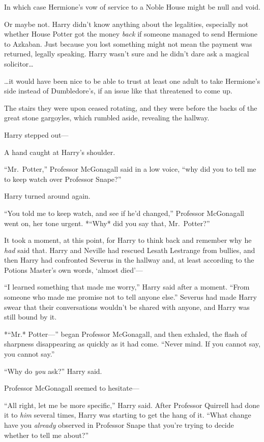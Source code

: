 In which case Hermione's vow of service to a Noble House might be null
and void.

Or maybe not. Harry didn't know anything about the legalities,
especially not whether House Potter got the money \emph{back} if someone
managed to send Hermione to Azkaban. Just because you lost something
might not mean the payment was returned, legally speaking. Harry wasn't
sure and he didn't dare ask a magical solicitor\ldots{}

\ldots{}it would have been nice to be able to trust at least one adult
to take Hermione's side instead of Dumbledore's, if an issue like that
threatened to come up.

The stairs they were upon ceased rotating, and they were before the
backs of the great stone gargoyles, which rumbled aside, revealing the
hallway.

Harry stepped out---

A hand caught at Harry's shoulder.

``Mr.~Potter,'' Professor McGonagall said in a low voice, ``why did you
to tell me to keep watch over Professor Snape?''

Harry turned around again.

``You told me to keep watch, and see if he'd changed,'' Professor
McGonagall went on, her tone urgent. *``Why* did you say that,
Mr.~Potter?''

It took a moment, at this point, for Harry to think back and remember
why he \emph{had} said that. Harry and Neville had rescued Lesath
Lestrange from bullies, and then Harry had confronted Severus in the
hallway and, at least according to the Potions Master's own words,
`almost died'---

``I learned something that made me worry,'' Harry said after a moment.
``From someone who made me promise not to tell anyone else.'' Severus
had made Harry swear that their conversations wouldn't be shared with
anyone, and Harry was still bound by it.

*``Mr.* Potter---'' began Professor McGonagall, and then exhaled, the
flash of sharpness disappearing as quickly as it had come. ``Never mind.
If you cannot say, you cannot say.''

``Why do \emph{you} ask?'' Harry said.

Professor McGonagall seemed to hesitate---

``All right, let me be more specific,'' Harry said. After Professor
Quirrell had done it to \emph{him} several times, Harry was starting to
get the hang of it. ``What change have you \emph{already} observed in
Professor Snape that you're trying to decide whether to tell me about?''

